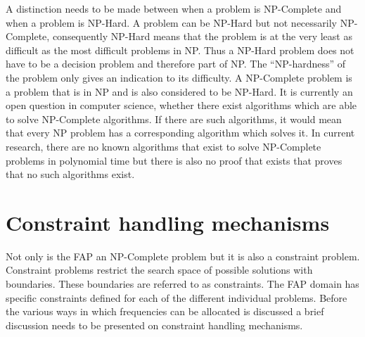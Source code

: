 A distinction needs to be made between when a problem is NP-Complete and when a problem is NP-Hard. A problem can be NP-Hard but not necessarily NP-Complete, consequently NP-Hard means that the problem is at the very least as difficult as the most difficult problems in NP. Thus a NP-Hard problem does not have to be a decision problem and therefore part of NP. The ``NP-hardness'' of the problem only gives an indication to its difficulty\cite{IntroToAlgos}.
A NP-Complete problem is a problem that is in NP and is also considered to be NP-Hard\cite{IntroToAlgos}. It is currently an open question in computer science, whether there exist algorithms which are able to solve NP-Complete algorithms. If there are such algorithms, it would mean that every NP problem has a corresponding algorithm which solves it\cite{IntroToAlgos}. In current research, there are no known algorithms that exist to solve NP-Complete problems in polynomial time but there is also no proof that exists that proves that no such algorithms exist\cite{IntroToAlgos}.

\section{Constraint handling mechanisms}
\label{sec:chm}
Not only is the \gls{FAP} an NP-Complete problem but it is also a constraint problem. Constraint problems restrict the search space of possible solutions with boundaries. These boundaries are referred to as constraints\cite{FundamentalSwarm}. The \gls{FAP} domain has specific constraints defined for each of the different individual problems. Before the various ways in which frequencies can be allocated is discussed a brief discussion needs to be presented on constraint handling mechanisms.

